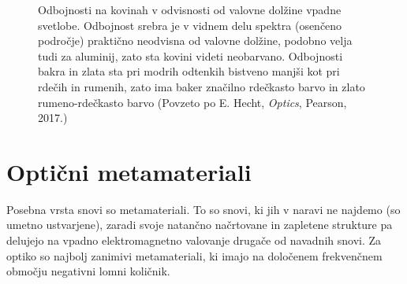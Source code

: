 \begin{figure}[htp]
\centering
\def\svgwidth{100truemm} 

\caption{Odbojnosti na kovinah v odvisnosti od valovne dolžine vpadne svetlobe. Odbojnost
srebra je v vidnem delu spektra (osenčeno področje) praktično 
neodvisna od valovne dolžine, podobno velja tudi za aluminij, zato sta kovini
videti neobarvano. Odbojnosti bakra in zlata sta pri modrih odtenkih bistveno 
manjši kot pri rdečih in rumenih, zato ima baker značilno rdečkasto barvo in zlato
rumeno-rdečkasto barvo (Povzeto po E. Hecht, {\it Optics}, Pearson, 2017.)}
\label{fig:09_kovine}
\end{figure}


\section{Optični metamateriali}
Posebna vrsta snovi so metamateriali. To so snovi, ki jih v naravi ne najdemo (so umetno
ustvarjene), zaradi svoje natančno načrtovane in zapletene strukture pa delujejo na 
vpadno elektromagnetno valovanje drugače od navadnih snovi. Za optiko so najbolj zanimivi
metamateriali, ki imajo na določenem frekvenčnem območju negativni lomni količnik.

